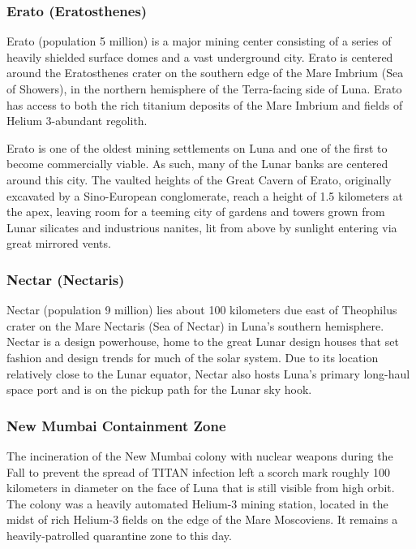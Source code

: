 \subsubsection{Erato (Eratosthenes)}

Erato (population 5 million) is a major mining center 
consisting of a series of heavily shielded surface domes 
and a vast underground city. Erato is centered around 
the Eratosthenes crater on the southern edge of the 
Mare Imbrium (Sea of Showers), in the northern 
hemisphere of the Terra-facing side of Luna. Erato has 
access to both the rich titanium deposits of the Mare 
Imbrium and fields of Helium 3-abundant regolith.

Erato is one of the oldest mining settlements on 
Luna and one of the first to become commercially 
viable. As such, many of the Lunar banks are centered 
around this city. The vaulted heights of the Great 
Cavern of Erato, originally excavated by a Sino-European conglomerate, reach a height of 1.5 kilometers at 
the apex, leaving room for a teeming city of gardens 
and towers grown from Lunar silicates and industrious nanites, lit from above by sunlight entering via 
great mirrored vents.

\subsubsection{Nectar (Nectaris)}

Nectar (population 9 million) lies about 100 kilometers due east of Theophilus crater on the Mare 
Nectaris (Sea of Nectar) in Luna's southern hemisphere. Nectar is a design powerhouse, home to the 
great Lunar design houses that set fashion and design 
trends for much of the solar system. Due to its location relatively close to the Lunar equator, Nectar also 
hosts Luna's primary long-haul space port and is on 
the pickup path for the Lunar sky hook.

\subsubsection{New Mumbai Containment Zone}

The incineration of the New Mumbai colony with 
nuclear weapons during the Fall to prevent the spread 
of TITAN infection left a scorch mark roughly 100 
kilometers in diameter on the face of Luna that is 
still visible from high orbit. The colony was a heavily 
automated Helium-3 mining station, located in the 
midst of rich Helium-3 fields on the edge of the Mare 
Moscoviens. It remains a heavily-patrolled quarantine 
zone to this day.


